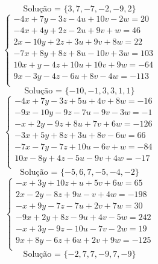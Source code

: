 \documentclass[12pt,oneside,a4paper]{article}
\begin{document}
\begin{equation*}
\text{Solução = }\{3,7,-7,-2,-9,2\}
\end{equation*}
\vspace{\baselineskip}
\begin{equation*}
\begin{cases}
-4x+7y-3z-4u+10v-2w=20 \\
-4x+4y+2z-2u+9v+w=46 \\
2x-10y+2z+3u+9v+8w=22 \\
-7x+8y+8z+8u-10v+3w=103 \\
10x+y-4z+10u+10v+9w=-64 \\
9x-3y-4z-6u+8v-4w=-113 \\
\end{cases}
\end{equation*}
\begin{equation*}
\text{Solução = }\{-10,-1,3,3,1,1\}
\end{equation*}
\vspace{\baselineskip}
\begin{equation*}
\begin{cases}
-4x+7y-3z+5u+4v+8w=-16 \\
-9x-10y-9z-7u-9v-3w=-1 \\
-x+2y-9z+8u+7v+6w=-126 \\
-3x+5y+8z+3u+8v-6w=66 \\
-7x-7y-7z+10u-6v+w=-84 \\
10x-8y+4z-5u-9v+4w=-17 \\
\end{cases}
\end{equation*}
\begin{equation*}
\text{Solução = }\{-5,6,7,-5,-4,-2\}
\end{equation*}
\vspace{\baselineskip}
\begin{equation*}
\begin{cases}
-x+3y+10z+u+5v+6w=65 \\
2x-2y-8z+9u-v+4w=-198 \\
-x+9y-7z-7u+2v+7w=30 \\
-9x+2y+8z-9u+4v-5w=242 \\
-x+3y-9z-10u-7v-2w=19 \\
9x+8y-6z+6u+2v+9w=-125 \\
\end{cases}
\end{equation*}
\begin{equation*}
\text{Solução = }\{-2,7,7,-9,7,-9\}
\end{equation*}
\end{document}
